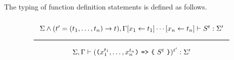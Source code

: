 The typing of function definition statements is defined as follows.

\noindent
\[
  \Rule{\Sigma \wedge (t' = (t_1, \ldots, t_n) \rightarrow t), \Gamma[x_1 \leftarrow t_1]\cdots
    [x_n \leftarrow t_n]
    \vdash S^{t} : \Sigma'}{
    \Sigma, \Gamma \vdash ( \Lp  x_1^{t_1}, \ldots, x_n^{t_n} \Rp\ \texttt{=>}\ \Lc\ S^{t}\ \Rc)^{t'} : \Sigma'}  
\]






